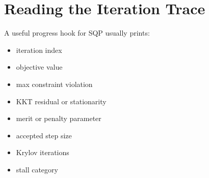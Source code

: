 \documentclass[letterpaper,10pt,english]{sphinxmanual}
\begin{document}
\section{Reading the Iteration Trace}
\label{\detokenize{optima_sequential_qp:reading-the-iteration-trace}}
\sphinxAtStartPar
A useful progress hook for SQP usually prints:
\begin{itemize}
\item {} 
\sphinxAtStartPar
iteration index

\item {} 
\sphinxAtStartPar
objective value

\item {} 
\sphinxAtStartPar
max constraint violation

\item {} 
\sphinxAtStartPar
KKT residual or stationarity

\item {} 
\sphinxAtStartPar
merit or penalty parameter

\item {} 
\sphinxAtStartPar
accepted step size

\item {} 
\sphinxAtStartPar
Krylov iterations

\item {} 
\sphinxAtStartPar
stall category

\end{itemize}
\end{document}
